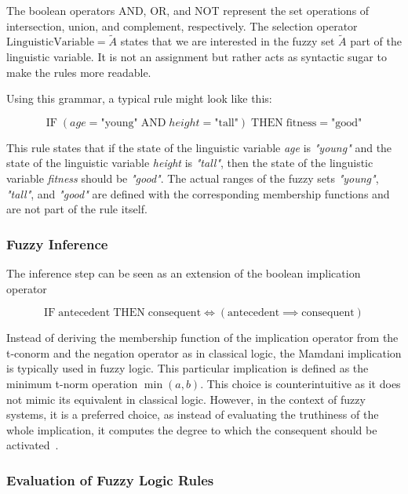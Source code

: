 The boolean operators AND, OR, and NOT represent the set operations of intersection, union, and complement, respectively. The selection operator $\text{LinguisticVariable} = \tilde{A}$ states that we are interested in the fuzzy set $\tilde{A}$ part of the linguistic variable. It is not an assignment but rather acts as syntactic sugar to make the rules more readable.

\medskip


Using this grammar, a typical rule might look like this:

\begin{equation*}
      \text{IF} \;( age = \text{"young"} \; \text{AND} \; height = \text{"tall"} ) \; \text{THEN} \; \text{fitness} = \text{"good"}
\end{equation*}

This rule states that if the state of the linguistic variable \emph{age} is \emph{"young"} and the state of the linguistic variable \emph{height} is \emph{"tall"}, then the state of the linguistic variable \emph{fitness} should be \emph{"good"}. The actual ranges of the fuzzy sets \emph{"young"}, \emph{"tall"}, and \emph{"good"} are defined with the corresponding membership functions and are not part of the rule itself.

\subsubsection{Fuzzy Inference}

The inference step can be seen as an extension of the boolean implication operator

\begin{equation*}
      \text{IF} \; \text{antecedent} \; \text{THEN} \; \text{consequent} \iff (\text{antecedent} \implies \text{consequent})
\end{equation*}

Instead of deriving the membership function of the implication operator from the t-conorm and the negation operator as in classical logic, the Mamdani implication is typically used in fuzzy logic. This particular implication is defined as the minimum t-norm operation $\min(a,b)$. This choice is counterintuitive as it does not mimic its equivalent in classical logic. However, in the context of fuzzy systems, it is a preferred choice, as instead of evaluating the truthiness of the whole implication, it computes the degree to which the consequent should be activated~\cite{BouchonMeunier1995}.

\subsubsection{Evaluation of Fuzzy Logic Rules}

